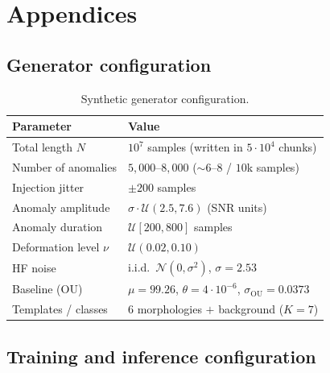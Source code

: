 \appendix
\chapter{Appendices}
\label{chap:appendix}

\section{Generator configuration}
\label{app:gen}

\begin{table}[H]
    \centering \footnotesize
    \begin{tabular}{ll}
        \toprule
        Parameter & Value \\
        \midrule
        Total length $N$              & $10^{7}$ samples (written in $5\cdot10^{4}$ chunks) \\
        Number of anomalies           & $5{,}000$--$8{,}000$ ($\sim 6$--$8$ / $10$k samples) \\
        Injection jitter              & $\pm 200$ samples \\
        Anomaly amplitude             & $\sigma\cdot\mathcal{U}(2.5,7.6)$ (SNR units) \\
        Anomaly duration              & $\mathcal{U}[200,800]$ samples \\
        Deformation level $\nu$       & $\mathcal{U}(0.02,0.10)$ \\
        HF noise                      & i.i.d.\ $\mathcal{N}(0,\sigma^2)$, $\sigma=2.53$ \\
        Baseline (OU)                 & $\mu=99.26$, $\theta=4\cdot10^{-6}$, $\sigma_{\mathrm{OU}}=0.0373$ \\
        Templates / classes           & 6 morphologies $+$ background ($K=7$) \\
        \bottomrule
    \end{tabular}
    \caption{Synthetic generator configuration.}
    \label{tab:app-gen}
\end{table}

\section{Training and inference configuration}
\label{app:hp}

